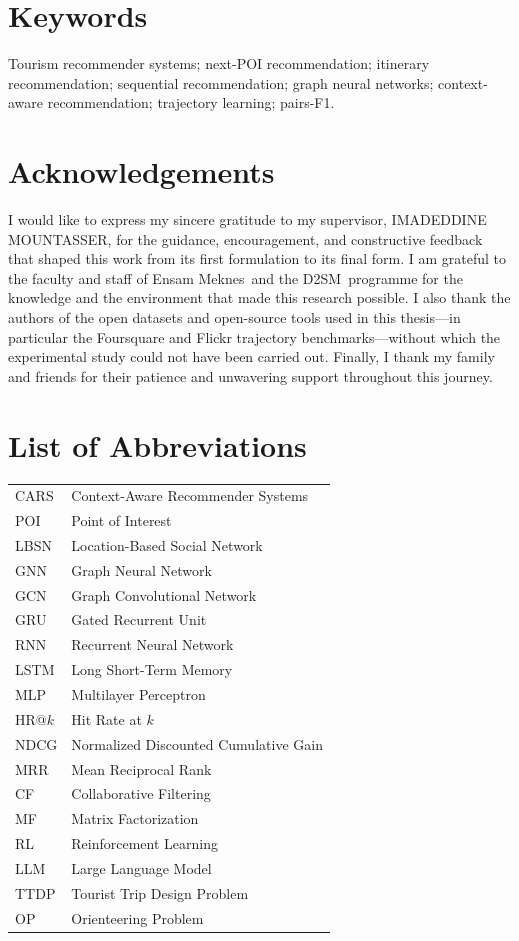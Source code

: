 \documentclass[12pt,oneside]{book}
\newcommand{\ThesisProgram}{D2SM}
\newcommand{\ThesisUniversity}{Ensam Meknes}
\newcommand{\ThesisSupervisor}{IMADEDDINE MOUNTASSER}
\begin{document}
\chapter*{Keywords}
Tourism recommender systems; next-POI recommendation; itinerary recommendation; sequential recommendation; graph neural networks; context-aware recommendation; trajectory learning; pairs-F1.

\chapter*{Acknowledgements}
I would like to express my sincere gratitude to my supervisor, \ThesisSupervisor, for the
guidance, encouragement, and constructive feedback that shaped this work from its first
formulation to its final form. I am grateful to the faculty and staff of \ThesisUniversity\ and
the \ThesisProgram\ programme for the knowledge and the environment that made this research
possible. I also thank the authors of the open datasets and open-source tools used in this
thesis---in particular the Foursquare and Flickr trajectory benchmarks---without which the
experimental study could not have been carried out. Finally, I thank my family and friends for
their patience and unwavering support throughout this journey.

\tableofcontents
\listoffigures
\listoftables

\chapter*{List of Abbreviations}
\begin{tabular}{@{}ll@{}}
CARS & Context-Aware Recommender Systems \\
POI  & Point of Interest \\
LBSN & Location-Based Social Network \\
GNN  & Graph Neural Network \\
GCN  & Graph Convolutional Network \\
GRU  & Gated Recurrent Unit \\
RNN  & Recurrent Neural Network \\
LSTM & Long Short-Term Memory \\
MLP  & Multilayer Perceptron \\
HR@$k$  & Hit Rate at $k$ \\
NDCG & Normalized Discounted Cumulative Gain \\
MRR  & Mean Reciprocal Rank \\
CF   & Collaborative Filtering \\
MF   & Matrix Factorization \\
RL   & Reinforcement Learning \\
LLM  & Large Language Model \\
TTDP & Tourist Trip Design Problem \\
OP   & Orienteering Problem \\
\end{tabular}
\end{document}
